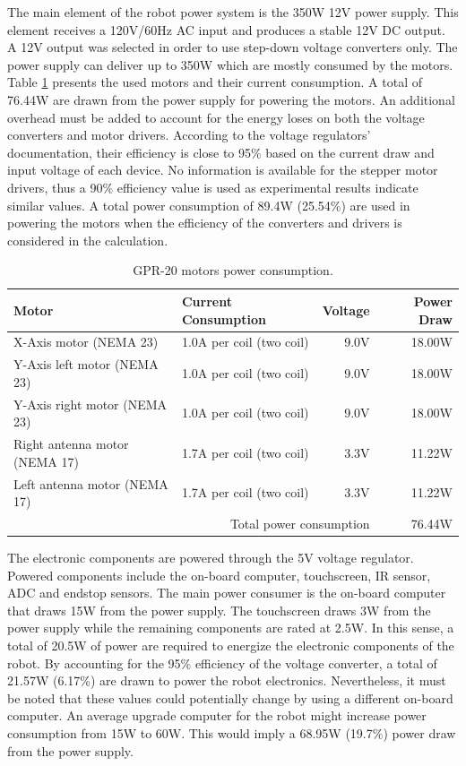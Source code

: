 \documentclass{article}
\begin{document}
The main element of the robot power system is the 350W 12V power supply. This element receives a 120V/60Hz AC input and produces a stable 12V DC output. A 12V output was selected in order to use step-down voltage converters only. The power supply can deliver up to 350W which are mostly consumed by the motors. Table \ref{tab:motor_current} presents the used motors and their current consumption. A total of 76.44W are drawn from the power supply for powering the motors. An additional overhead must be added to account for the energy loses on both the voltage converters and motor drivers. According to the voltage regulators' documentation, their efficiency is close to 95\% based on the current draw and input voltage of each device. No information is available for the stepper motor drivers, thus a 90\% efficiency value is used as experimental results indicate similar values. A total power consumption of 89.4W (25.54\%) are used in powering the motors when the efficiency of the converters and drivers is considered in the calculation. 

\begin{table}[h]
    \centering
    \begin{tabular}{|l|l|r|r|}
        \hline \textbf{Motor} & \textbf{Current Consumption} & \textbf{Voltage} & \textbf{Power Draw} \\ \hline
        X-Axis motor (NEMA 23) & 1.0A per coil (two coil) & 9.0V & 18.00W \\ \hline
        Y-Axis left motor (NEMA 23) & 1.0A per coil (two coil) & 9.0V & 18.00W \\ \hline
        Y-Axis right motor (NEMA 23) & 1.0A per coil (two coil) & 9.0V & 18.00W \\ \hline
        Right antenna motor (NEMA 17) & 1.7A per coil (two coil) & 3.3V & 11.22W \\ \hline
        Left antenna motor (NEMA 17) & 1.7A per coil (two coil) & 3.3V & 11.22W \\ \hline \hline
        \multicolumn{3}{|r|}{Total power consumption} & 76.44W \\ \hline
    \end{tabular}
    \caption{GPR-20 motors power consumption.}
    \label{tab:motor_current}
\end{table}

The electronic components are powered through the 5V voltage regulator. Powered components include the on-board computer, touchscreen, IR sensor, ADC and endstop sensors. The main power consumer is the on-board computer that draws 15W from the power supply. The touchscreen draws 3W from the power supply while the remaining components are rated at 2.5W. In this sense, a total of 20.5W of power are required to energize the electronic components of the robot. By accounting for the 95\% efficiency of the voltage converter, a total of 21.57W (6.17\%) are drawn to power the robot electronics. Nevertheless, it must be noted that these values could potentially change by using a different on-board computer. An average upgrade computer for the robot might increase power consumption from 15W to 60W. This would imply a 68.95W (19.7\%) power draw from the power supply.
\end{document}
